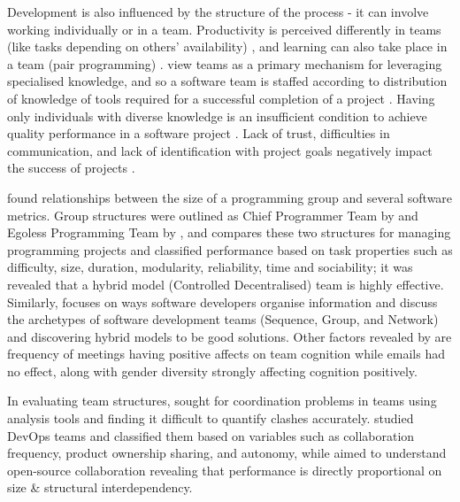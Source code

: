 \documentclass{mprop}
\begin{document}
Development is also influenced by the structure of the process - it can involve working individually or in a team. Productivity is perceived differently in teams (like tasks depending on others' availability) \cite{ruvimovaExploratoryStudyProductivity2022}, and learning can also take place in a team (pair programming) \cite{murphy2019developers}. \textcite{cookeMeasuringTeamKnowledge2001,lewisMeasuringTransactiveMemory2003} view teams as a primary mechanism for leveraging specialised knowledge, and so a software team is staffed according to distribution of knowledge of tools required for a successful completion of a project \cite{walzSoftwareDesignTeam1993}. Having only individuals with diverse knowledge is an insufficient condition to achieve quality performance in a software project \cite{farajCoordinatingExpertiseSoftware2000}. Lack of trust, difficulties in communication, and lack
of identification with project goals negatively impact the
success of projects \cite{smiteEmpiricalEvidenceGlobal2010,holmstromAgilePracticesReduce2006,hymanCreativeChaosHighperformance1993}.

\textcite{basili1979investigation} found relationships between the size of a programming group and several software metrics. Group structures were outlined as Chief Programmer Team by \textcite{mills1971chief,bakerChiefProgrammerTeam1972} and Egoless Programming Team by \textcite{weinbergPsychologyComputerProgramming1988}, and \textcite{manteiEffectProgrammingTeam1981} compares these two structures for managing programming projects and classified performance based on task properties such as difficulty, size, duration, modularity, reliability, time and sociability; it was revealed that a hybrid model (Controlled Decentralised) team is highly effective. Similarly, \textcite{sawyerSoftwareDevelopmentTeams2004} focuses on ways software developers organise information and discuss the archetypes of software development teams (Sequence, Group, and Network) and discovering hybrid models to be good solutions. Other factors revealed by \textcite{heTeamCognitionDevelopment2007} are frequency of meetings having positive affects on team cognition while emails had no effect, along with gender diversity strongly affecting cognition positively.

In evaluating team structures, \textcite{amritIdentifyingCoordinationProblems2012} sought for coordination problems in teams using analysis tools and finding it difficult to quantify clashes accurately. \textcite{lopez-fernandezDevOpsTeamStructures2022} studied DevOps teams and classified them based on variables such as collaboration frequency, product ownership sharing, and autonomy, while \textcite{nanJointEffectTeam2013} aimed to understand open-source collaboration revealing that performance is directly proportional on size \& structural interdependency.
\end{document}
